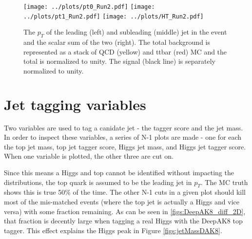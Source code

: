 \documentclass[10pt,oneside]{article}
\begin{document}

\begin{figure}[H]
    \texttt{[image: ../plots/pt0\_Run2.pdf]}
    \texttt{[image: ../plots/pt1\_Run2.pdf]}
    \texttt{[image: ../plots/HT\_Run2.pdf]}
    \caption{The $p_T$ of the leading (left) and subleading (middle) jet in the event and the scalar sum of the two (right).
    The total background is represented as a stack of QCD (yellow) and ttbar (red) MC and the total is normalized to
    unity. The signal (black line) is separately normalized to unity.}
    \label{figs:pt}
\end{figure}



\section{Jet tagging variables}

Two variables are used to tag a canidate jet - the tagger score and the jet mass.
In order to inspect these variables, a series of N-1 plots are made - one for each
the top jet mass, top jet tagger score, Higgs jet mass, and Higgs jet tagger score.
When one variable is plotted, the other three are cut on.

Since this means a Higgs and top cannot be identified without impacting the distributions,
the top quark is assumed to be the leading jet in $p_T$. The MC truth shows this is true 50\%
of the time. The other N-1 cuts in a given plot should kill most
of the mis-matched events (where the top jet is actually a Higgs and vice versa)
with some fraction remaining. As can be seen in \ref{figs:DeepAK8_diff_2D}, that 
fraction is decently large when tagging a
real Higgs with the DeepAK8 top tagger. This effect explains the Higgs peak
in Figure \ref{figs:jetMassDAK8}.
\end{document}
